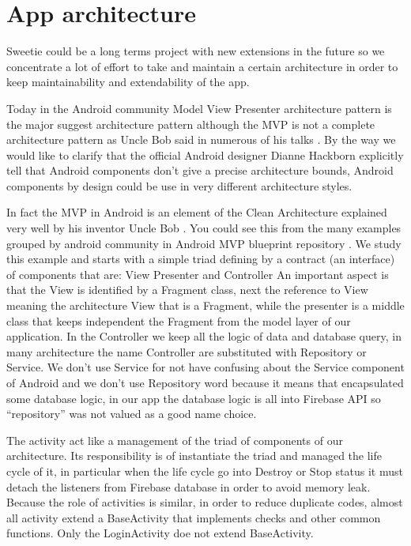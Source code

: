 
\section{App architecture}
\label{sec:app-architecture}

Sweetie could be a long terms project with new extensions in the future so we concentrate a lot of effort to take and maintain a certain architecture in order to keep maintainability and extendability of the app.

Today in the Android community Model View Presenter architecture pattern is the major suggest architecture pattern although the MVP is not a complete architecture pattern as Uncle Bob said in numerous of his talks \cite{Uncle_Bob_MVP}.  By the way we would like to clarify that the official Android designer Dianne Hackborn \cite{Dianne_Hackborn_android_arch} explicitly tell that Android components don't give a precise architecture bounds, Android components by design could be use in very different architecture styles.

In fact the MVP in Android is an element of the Clean Architecture explained very well by his inventor Uncle Bob \cite{Uncle_Bob_CleanArc}. You could see this from the many examples grouped by android community in Android MVP blueprint repository \cite{Android_MVP_blueprints}. We study this example and starts with a simple triad defining by a contract (an interface) of components that are:
View Presenter and Controller
An important aspect is that the View is identified by a Fragment class, next the reference to View meaning the architecture View that is a Fragment, while the presenter is a middle class that keeps independent the Fragment from the model layer of our application. In the Controller we keep all the logic of data and database query, in many architecture the name Controller are substituted with Repository or Service. We don't use Service for not have confusing about the Service component of Android and we don't use Repository word because it means that encapsulated some database logic, in our app the database logic is all into Firebase API so ``repository'' was not valued as a good name choice. 

The activity act like a management of the triad of components of our architecture.
Its responsibility is of instantiate the triad and managed the life cycle of it, in particular when the life cycle go into Destroy or Stop status it must detach the listeners from Firebase database in order to avoid memory leak. Because the role of activities is similar, in order to reduce duplicate codes, almost all activity extend a BaseActivity that implements checks and other common functions. Only the LoginActivity doe not extend BaseActivity.

